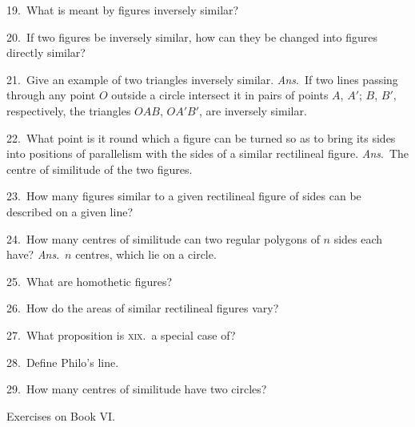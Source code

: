 \documentclass[oneside]{book}
\newcommand\exhead[1]{
\Needspace*{5\baselineskip}\begin{center}
\textsf{#1}
\end{center}
}
\begin{document}
\begin{footnotesize}
19.~What is meant by figures inversely similar?

20.~If two figures be inversely similar, how can they be
changed into figures directly similar?

21.~Give an example of two triangles inversely similar. \textit{Ans}.\
If two lines passing through any point $O$ outside a circle intersect
it in pairs of points $A$, $A'$; $B$, $B'$, respectively, the triangles
$OAB$, $OA'B'$, are inversely similar.

22.~What point is it round which a figure can be turned so as
to bring its sides into positions of parallelism with the sides of a
similar rectilineal figure. \textit{Ans}.\ The centre of similitude of the
two figures.

23.~How many figures similar to a given rectilineal figure of
sides can be described on a given line?

24.~How many centres of similitude can two regular polygons
of $n$ sides each have? \textit{Ans}.\ $n$ centres, which lie on a
circle.

25.~What are homothetic figures?

26.~How do the areas of similar rectilineal figures vary?

27.~What proposition is \textsc{xix}.\ a special case of?

28.~Define Philo's line.

29.~How many centres of similitude have two circles?
\par\end{footnotesize}

\exhead{Exercises on Book VI\@.}
\end{document}
